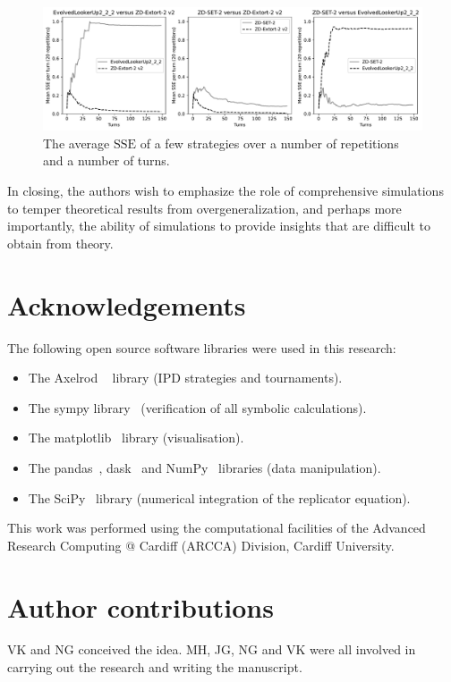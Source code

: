 \documentclass[a4paper]{article}
\newcommand{\SSe}{\text{SSE}}
\begin{document}
\begin{figure}[!htbp]
    \centering
    \includegraphics[width=.8\textwidth]{./assets/img/learning_sse/main.pdf}
    \caption{The average \(\SSe\) of a few strategies over a number of
    repetitions and a number of turns.
        }
    \label{fig:learning_sse}
\end{figure}

In closing, the authors wish to emphasize the role of comprehensive simulations to temper
theoretical results from overgeneralization, and perhaps more importantly, the
ability of simulations to provide insights that are difficult to obtain from theory.

\section*{Acknowledgements}

The following open source software libraries were used in this research:

\begin{itemize}
    \item The Axelrod ~\cite{Knight2016, Knight2018} library (IPD strategies and
        tournaments).
    \item The sympy library~\cite{Meurer2017} (verification of all symbolic
        calculations).
    \item The matplotlib~\cite{Droettboom2018} library (visualisation).
    \item The pandas~\cite{Structures2010}, dask~\cite{Dask2016} and
        NumPy~\cite{Oliphant2015} libraries (data manipulation).
    \item The SciPy~\cite{Jones2001} library (numerical integration of the
        replicator equation).
\end{itemize}

This work was performed using the computational facilities of the Advanced
Research Computing @ Cardiff (ARCCA) Division, Cardiff University.

\section*{Author contributions}

VK and NG conceived the idea. MH, JG, NG and VK were all involved in carrying
out the research and writing the manuscript.

\printbibliography




\end{document}
